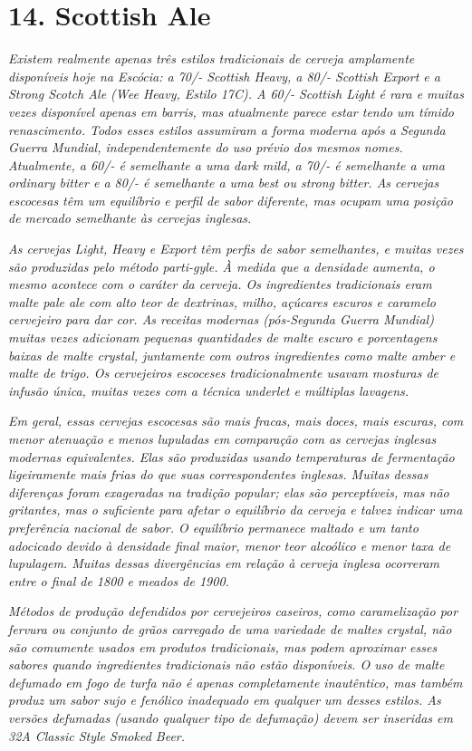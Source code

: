 \section*{14. Scottish Ale}
\textit{Existem realmente apenas três estilos tradicionais de cerveja amplamente disponíveis hoje na Escócia: a 70/- Scottish Heavy, a 80/- Scottish Export e a Strong Scotch Ale (Wee Heavy, Estilo 17C). A 60/- Scottish Light é rara e muitas vezes disponível apenas em barris, mas atualmente parece estar tendo um tímido renascimento. Todos esses estilos assumiram a forma moderna após a Segunda Guerra Mundial, independentemente do uso prévio dos mesmos nomes. Atualmente, a 60/- é semelhante a uma dark mild, a 70/- é semelhante a uma ordinary bitter e a 80/- é semelhante a uma best ou strong bitter. As cervejas escocesas têm um equilíbrio e perfil de sabor diferente, mas ocupam uma posição de mercado semelhante às cervejas inglesas.} 

\textit{As cervejas Light, Heavy e Export têm perfis de sabor semelhantes, e muitas vezes são produzidas pelo método parti-gyle. À medida que a densidade aumenta, o mesmo acontece com o caráter da cerveja. Os ingredientes tradicionais eram malte pale ale com alto teor de dextrinas, milho, açúcares escuros e caramelo cervejeiro para dar cor. As receitas modernas (pós-Segunda Guerra Mundial) muitas vezes adicionam pequenas quantidades de malte escuro e porcentagens baixas de malte crystal, juntamente com outros ingredientes como malte amber e malte de trigo. Os cervejeiros escoceses tradicionalmente usavam mosturas de infusão única, muitas vezes com a técnica underlet e múltiplas lavagens.}

\textit{Em geral, essas cervejas escocesas são mais fracas, mais doces, mais escuras, com menor atenuação e menos lupuladas em comparação com as cervejas inglesas modernas equivalentes. Elas são produzidas usando temperaturas de fermentação ligeiramente mais frias do que suas correspondentes inglesas. Muitas dessas diferenças foram exageradas na tradição popular; elas são perceptíveis, mas não gritantes, mas o suficiente para afetar o equilíbrio da cerveja e talvez indicar uma preferência nacional de sabor. O equilíbrio permanece maltado e um tanto adocicado devido à densidade final maior, menor teor alcoólico e menor taxa de lupulagem. Muitas dessas divergências em relação à cerveja inglesa ocorreram entre o final de 1800 e meados de 1900.}

\textit{Métodos de produção defendidos por cervejeiros caseiros, como caramelização por fervura ou conjunto de grãos carregado de uma variedade de maltes crystal, não são comumente usados em produtos tradicionais, mas podem aproximar esses sabores quando ingredientes tradicionais não estão disponíveis. O uso de malte defumado em fogo de turfa não é apenas completamente inautêntico, mas também produz um sabor sujo e fenólico inadequado em qualquer um desses estilos. As versões defumadas (usando qualquer tipo de defumação) devem ser inseridas em 32A Classic Style Smoked Beer. }

